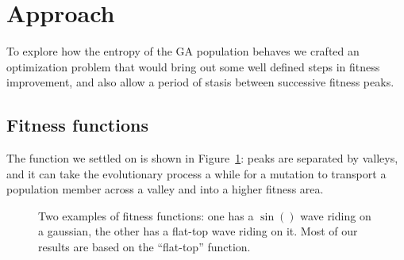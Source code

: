 \documentclass[11pt]{article}
\begin{document}
\section{Approach}
\label{sec:org8c588e5}

To explore how the entropy of the GA population behaves we crafted an
optimization problem that would bring out some well defined steps in
fitness improvement, and also allow a period of stasis between
successive fitness peaks.

\subsection{Fitness functions}

The function we settled on is shown in
Figure~\ref{fig:fit-func_pid3095791}: peaks are separated by valleys,
and it can take the evolutionary process a while for a mutation to
transport a population member across a valley and into a higher
fitness area.

\begin{figure}
  \centering
  \caption{Two examples of fitness functions: one has a $\sin()$ wave
    riding on a gaussian, the other has a flat-top wave riding on it.
  Most of our results are based on the ``flat-top'' function.}
  \label{fig:fit-func_pid3095791}
\end{figure}
\end{document}
